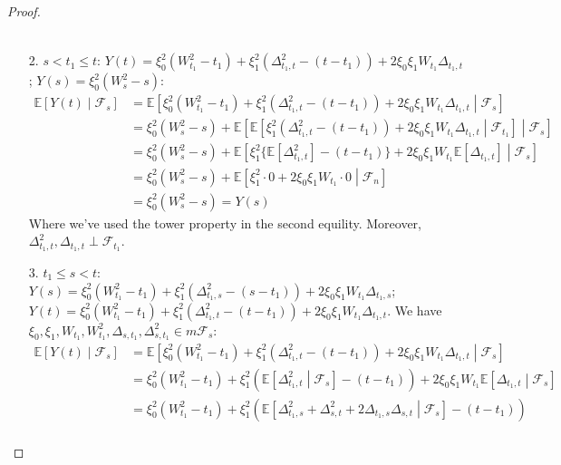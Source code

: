 \documentclass[a4paper, 10pt]{article}
\theoremstyle{definition}
\theoremstyle{hSol}
\begin{document}
\begin{proof}
\begin{itemize}
\begin{equation}
\begin{split}
		\end{split}
	\end{equation}
	\item[2.] $s<t_1\leq t$: $Y(t)=\xi_0^2 (W_{t_1}^2 - t_1) + \xi_1^2 (\Delta_{t_1,t}^2 - (t-t_1)) + 2\xi_0 \xi_1 W_{t_1}\Delta_{t_1, t}$;  $Y(s)=\xi_0^2 (W^2_s - s)$:
	\begin{equation}
		\begin{split}
			\mathbb{E}\left[Y(t)\middle|\mathcal{F}_s\right] &= \mathbb{E}\left[\xi_0^2 (W_{t_1}^2 - t_1) + \xi_1^2 (\Delta_{t_1,t}^2 - (t-t_1)) + 2\xi_0 \xi_1 W_{t_1}\Delta_{t_1, t}\middle|\mathcal{F}_s\right] \\
			&= \xi_0^2 (W_{s}^2 - s) + \mathbb{E}\left[\mathbb{E}\left[\xi_1^2 (\Delta_{t_1,t}^2 - (t-t_1)) + 2\xi_0 \xi_1 W_{t_1}\Delta_{t_1, t}\middle|\mathcal{F}_{t_1}\right]\middle|\mathcal{F}_s\right] \\
			&= \xi_0^2 (W_{s}^2 - s) + \mathbb{E}\left[\xi_1^2 \{\mathbb{E}\left[\Delta_{t_1,t}^2\right] - (t-t_1)\} + 2\xi_0 \xi_1 W_{t_1}\mathbb{E}\left[\Delta_{t_1, t}\right]\middle|\mathcal{F}_s\right] \\
			&= \xi_0^2 (W_{s}^2 - s) + \mathbb{E}\left[\xi_1^2\cdot 0 + 2\xi_0 \xi_1 W_{t_1}\cdot 0\middle|\mathcal{F}_n\right] \\
			&= \xi_0^2 (W_{s}^2 - s) = Y(s)
		\end{split}
	\end{equation}
	Where we've used the tower property in the second equility. Moreover, $\Delta^2_{t_1, t}, \Delta_{t_1, t}\perp \mathcal{F}_{t_1}$.
	\item[3.] $t_1\leq s<t$: $Y(s)=\xi_0^2 (W_{t_1}^2 - t_1) + \xi_1^2 (\Delta_{t_1,s}^2 - (s-t_1)) + 2\xi_0 \xi_1 W_{t_1}\Delta_{t_1, s}$; ~~$Y(t)=\xi_0^2 (W_{t_1}^2 - t_1) + \xi_1^2 (\Delta_{t_1,t}^2 - (t-t_1)) + 2\xi_0 \xi_1 W_{t_1}\Delta_{t_1, t}$. We have $\xi_0, \xi_1, W_{t_1}, W_{t_1}^2, \Delta_{s,t_1}, \Delta_{s,t_1}^2 \in m \mathcal{F}_s$: 
	\begin{equation}
		\begin{split}
			\mathbb{E}\left[Y(t)\middle|\mathcal{F}_s\right] &= \mathbb{E}\left[\xi_0^2 (W_{t_1}^2 - t_1) + \xi_1^2 (\Delta_{t_1,t}^2 - (t-t_1)) + 2\xi_0 \xi_1 W_{t_1}\Delta_{t_1, t}\middle|\mathcal{F}_s\right] \\
			&= \xi_0^2 (W_{t_1}^2 - t_1) + \xi_1^2 (\mathbb{E}\left[\Delta_{t_1,t}^2\middle|\mathcal{F}_s\right] - (t-t_1)) + 2\xi_0 \xi_1 W_{t_1}\mathbb{E}\left[\Delta_{t_1,t}\middle|\mathcal{F}_s\right] \\
			&= \xi_0^2 (W_{t_1}^2 - t_1) + \xi_1^2 (\mathbb{E}\left[\Delta_{t_1,s}^2+\Delta_{s,t}^2+2\Delta_{t_1,s}\Delta_{s,t}\middle|\mathcal{F}_s\right] - (t-t_1)) \\

\end{split}
\end{equation}
\end{itemize}
\end{proof}
\end{document}
